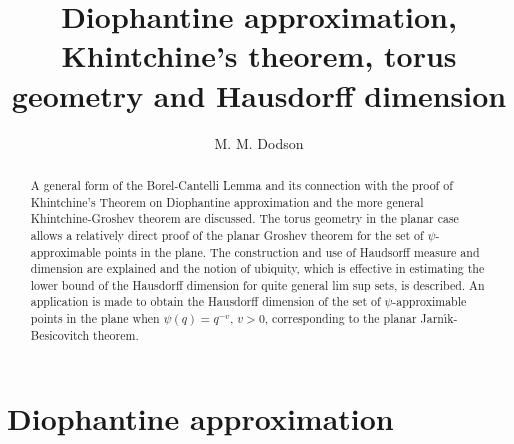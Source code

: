 \documentclass[reqno]{amsart}
\title{Diophantine approximation, Khintchine's theorem, torus geometry and
                       Hausdorff  dimension}
\author{M. M. Dodson}
\newcommand{\0}{{\mathbf{0}}}
\newcommand{\HD}{Hausdorff dimension}
\newcommand{\JB}{Jarn\'{\i}k-Besicovitch}
\newcommand{\KG}{Khintchine-Groshev}
\begin{document}
\begin{abstract}
  A general form of the Borel-Cantelli Lemma and its connection with
  the proof of Khintchine's Theorem on Diophantine approximation and
  the more general \KG{} theorem are discussed. The torus geometry in
  the planar case allows a relatively direct proof of the planar
  Groshev theorem for the set of $\psi$-approximable points in the
  plane.  The construction and use of Haudsorff measure and dimension
  are explained and the notion of ubiquity, which is effective in
  estimating the lower bound of the \HD{} for quite general lim sup
  sets, is described. An application is made to obtain the \HD{} of
  the set of $\psi$-approximable points in the plane when
  $\psi(q)=q^{-v}$, $v>0$, corresponding to the planar \JB{} theorem. 
\end{abstract}


\maketitle


\section{Diophantine approximation}
\end{document}
